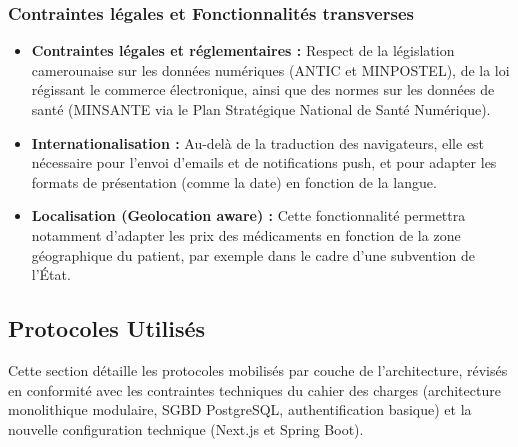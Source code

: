 \documentclass[12pt,a4paper]{report}
\begin{document}
\subsubsection*{Contraintes légales et Fonctionnalités transverses}
\begin{itemize}
    \item \textbf{Contraintes légales et réglementaires :} Respect de la législation camerounaise sur les données numériques (ANTIC et MINPOSTEL), de la loi régissant le commerce électronique, ainsi que des normes sur les données de santé (MINSANTE via le Plan Stratégique National de Santé Numérique).
    \item \textbf{Internationalisation :} Au-delà de la traduction des navigateurs, elle est nécessaire pour l'envoi d'emails et de notifications push, et pour adapter les formats de présentation (comme la date) en fonction de la langue.
    \item \textbf{Localisation (Geolocation aware) :} Cette fonctionnalité permettra notamment d'adapter les prix des médicaments en fonction de la zone géographique du patient, par exemple dans le cadre d'une subvention de l'État.
\end{itemize}

\subsection{Protocoles Utilisés}

Cette section détaille les protocoles mobilisés par couche de l'architecture, révisés en conformité avec les contraintes techniques du cahier des charges (architecture monolithique modulaire, SGBD PostgreSQL, authentification basique) et la nouvelle configuration technique (Next.js et Spring Boot).
\end{document}
